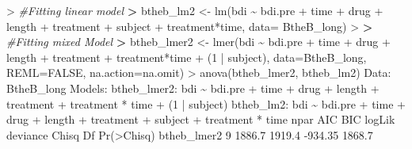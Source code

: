 \documentclass[
]{article}
\newenvironment{Shaded}{\begin{snugshade}}{\end{snugshade}}
\newcommand{\AttributeTok}[1]{\textcolor[rgb]{0.77,0.63,0.00}{#1}}
\newcommand{\CommentTok}[1]{\textcolor[rgb]{0.56,0.35,0.01}{\textit{#1}}}
\newcommand{\ConstantTok}[1]{\textcolor[rgb]{0.00,0.00,0.00}{#1}}
\newcommand{\DecValTok}[1]{\textcolor[rgb]{0.00,0.00,0.81}{#1}}
\newcommand{\ErrorTok}[1]{\textcolor[rgb]{0.64,0.00,0.00}{\textbf{#1}}}
\newcommand{\FloatTok}[1]{\textcolor[rgb]{0.00,0.00,0.81}{#1}}
\newcommand{\FunctionTok}[1]{\textcolor[rgb]{0.00,0.00,0.00}{#1}}
\newcommand{\NormalTok}[1]{#1}
\newcommand{\OtherTok}[1]{\textcolor[rgb]{0.56,0.35,0.01}{#1}}
\newcommand{\SpecialCharTok}[1]{\textcolor[rgb]{0.00,0.00,0.00}{#1}}
\begin{document}
\begin{Shaded}
\begin{Highlighting}[]
\SpecialCharTok{\textgreater{}} \CommentTok{\#Fitting linear model}
\ErrorTok{\textgreater{}}\NormalTok{ btheb\_lm2 }\OtherTok{\textless{}{-}} \FunctionTok{lm}\NormalTok{(bdi }\SpecialCharTok{\textasciitilde{}}\NormalTok{ bdi.pre }\SpecialCharTok{+}\NormalTok{ time }\SpecialCharTok{+}\NormalTok{ drug }\SpecialCharTok{+}\NormalTok{ length }\SpecialCharTok{+}\NormalTok{ treatment }\SpecialCharTok{+}\NormalTok{ subject }\SpecialCharTok{+}\NormalTok{ treatment}\SpecialCharTok{*}\NormalTok{time, }\AttributeTok{data=}\NormalTok{ BtheB\_long)}
\SpecialCharTok{\textgreater{}} 
\ErrorTok{\textgreater{}} \CommentTok{\#Fitting mixed Model}
\ErrorTok{\textgreater{}}\NormalTok{ btheb\_lmer2 }\OtherTok{\textless{}{-}} \FunctionTok{lmer}\NormalTok{(bdi }\SpecialCharTok{\textasciitilde{}}\NormalTok{ bdi.pre }\SpecialCharTok{+}\NormalTok{ time }\SpecialCharTok{+}\NormalTok{ drug }\SpecialCharTok{+}\NormalTok{ length }\SpecialCharTok{+}\NormalTok{ treatment }\SpecialCharTok{+}\NormalTok{ treatment}\SpecialCharTok{*}\NormalTok{time }\SpecialCharTok{+}\NormalTok{ (}\DecValTok{1} \SpecialCharTok{|}\NormalTok{ subject), }\AttributeTok{data=}\NormalTok{BtheB\_long, }\AttributeTok{REML=}\ConstantTok{FALSE}\NormalTok{, }\AttributeTok{na.action=}\NormalTok{na.omit)}
\SpecialCharTok{\textgreater{}} \FunctionTok{anova}\NormalTok{(btheb\_lmer2, btheb\_lm2)}
\NormalTok{Data}\SpecialCharTok{:}\NormalTok{ BtheB\_long}
\NormalTok{Models}\SpecialCharTok{:}
\NormalTok{btheb\_lmer2}\SpecialCharTok{:}\NormalTok{ bdi }\SpecialCharTok{\textasciitilde{}}\NormalTok{ bdi.pre }\SpecialCharTok{+}\NormalTok{ time }\SpecialCharTok{+}\NormalTok{ drug }\SpecialCharTok{+}\NormalTok{ length }\SpecialCharTok{+}\NormalTok{ treatment }\SpecialCharTok{+}\NormalTok{ treatment }\SpecialCharTok{*}\NormalTok{ time }\SpecialCharTok{+}\NormalTok{ (}\DecValTok{1} \SpecialCharTok{|}\NormalTok{ subject)}
\NormalTok{btheb\_lm2}\SpecialCharTok{:}\NormalTok{ bdi }\SpecialCharTok{\textasciitilde{}}\NormalTok{ bdi.pre }\SpecialCharTok{+}\NormalTok{ time }\SpecialCharTok{+}\NormalTok{ drug }\SpecialCharTok{+}\NormalTok{ length }\SpecialCharTok{+}\NormalTok{ treatment }\SpecialCharTok{+}\NormalTok{ subject }\SpecialCharTok{+}\NormalTok{ treatment }\SpecialCharTok{*}\NormalTok{ time}
\NormalTok{            npar    AIC    BIC  logLik deviance  Chisq Df }\FunctionTok{Pr}\NormalTok{(}\SpecialCharTok{\textgreater{}}\NormalTok{Chisq)    }
\NormalTok{btheb\_lmer2    }\DecValTok{9} \FloatTok{1886.7} \FloatTok{1919.4} \SpecialCharTok{{-}}\FloatTok{934.35}   \FloatTok{1868.7}                         

\end{Highlighting}
\end{Shaded}
\end{document}
